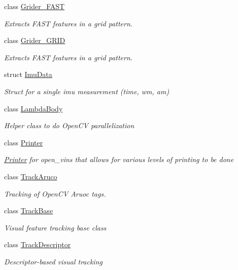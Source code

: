 \begin{DoxyCompactItemize}
class \hyperlink{classov__core_1_1Grider__FAST}{Grider\+\_\+\+F\+A\+ST}
\begin{DoxyCompactList}\small\item\em Extracts F\+A\+ST features in a grid pattern. \end{DoxyCompactList}\item 
class \hyperlink{classov__core_1_1Grider__GRID}{Grider\+\_\+\+G\+R\+ID}
\begin{DoxyCompactList}\small\item\em Extracts F\+A\+ST features in a grid pattern. \end{DoxyCompactList}\item 
struct \hyperlink{structov__core_1_1ImuData}{Imu\+Data}
\begin{DoxyCompactList}\small\item\em Struct for a single imu measurement (time, wm, am) \end{DoxyCompactList}\item 
class \hyperlink{classov__core_1_1LambdaBody}{Lambda\+Body}
\begin{DoxyCompactList}\small\item\em Helper class to do Open\+CV parallelization \end{DoxyCompactList}\item 
class \hyperlink{classov__core_1_1Printer}{Printer}
\begin{DoxyCompactList}\small\item\em \hyperlink{classov__core_1_1Printer}{Printer} for open\+\_\+vins that allows for various levels of printing to be done \end{DoxyCompactList}\item 
class \hyperlink{classov__core_1_1TrackAruco}{Track\+Aruco}
\begin{DoxyCompactList}\small\item\em Tracking of Open\+CV Aruoc tags. \end{DoxyCompactList}\item 
class \hyperlink{classov__core_1_1TrackBase}{Track\+Base}
\begin{DoxyCompactList}\small\item\em Visual feature tracking base class \end{DoxyCompactList}\item 
class \hyperlink{classov__core_1_1TrackDescriptor}{Track\+Descriptor}
\begin{DoxyCompactList}\small\item\em Descriptor-\/based visual tracking \end{DoxyCompactList}\item 

\end{DoxyCompactItemize}
